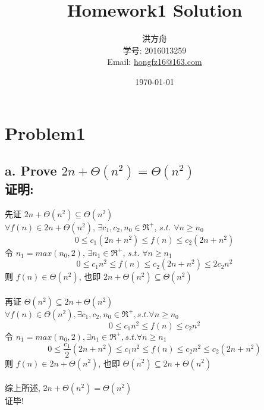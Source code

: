 \documentclass[12pt]{article}
\title{Homework1 Solution}
\date{\today}
\author{洪方舟\\学号: 2016013259\\Email: \href{mailto:hongfz16@163.com}{hongfz16@163.com}}
\begin{document}
  \maketitle
  \section*{Problem1}
    \subsection*{a. Prove $ 2n + \Theta(n^2) = \Theta(n^2) $ \\\textbf{证明:}}
      先证 $ 2n + \Theta(n^2) \subseteq \Theta(n^2) $ \\
      $ \forall f(n) \in 2n+\Theta(n^2) $, $ \exists c_{1}, c_{2}, n_{0} \in \Re^{+} $, $s.t.$ $ \forall n \geq n_{0} $
      \begin{equation}
        0 \leq c_{1}(2n+n^2) \leq f(n) \leq c_2(2n+n^2)
      \end{equation}
      令 $ n_1=max(n_0, 2) $, $ \exists n_1 \in \Re^+ $, $s.t.$ $ \forall n \geq n_1 $
      \begin{equation}
      	0 \leq c_1n^2 \leq f(n) \leq c_2(2n+n^2) \leq 2c_2n^2
      \end{equation}
      则 $ f(n) \in \Theta(n^2) $, 也即 $ 2n + \Theta(n^2) \subseteq \Theta(n^2) $\\\\
      再证 $ \Theta(n^2) \subseteq 2n + \Theta(n^2) $\\
      $ \forall f(n) \in \Theta(n^2), \exists c_1, c_2, n_0 \in \Re^+, s.t. \forall n \geq n_0 $
      \begin{equation}
      	0 \leq c_1n^2 \leq f(n) \leq c_2n^2
      \end{equation}
      令 $ n_1=max(n_0, 2), \exists n_1 \in \Re^+, s.t. \forall n \geq n_1 $
      \begin{equation}
        0 \leq \frac{c_1}{2}(2n+n^2) \leq c_1n^2 \leq f(n) \leq c_2n^2 \leq c_2(2n+n^2)
      \end{equation}
      则 $ f(n) \in 2n+\Theta(n^2) $, 也即 $ \Theta(n^2) \subseteq 2n+\Theta(n^2) $\\\\
      综上所述, $ 2n + \Theta(n^2) = \Theta(n^2) $\\
      证毕!
\end{document}
